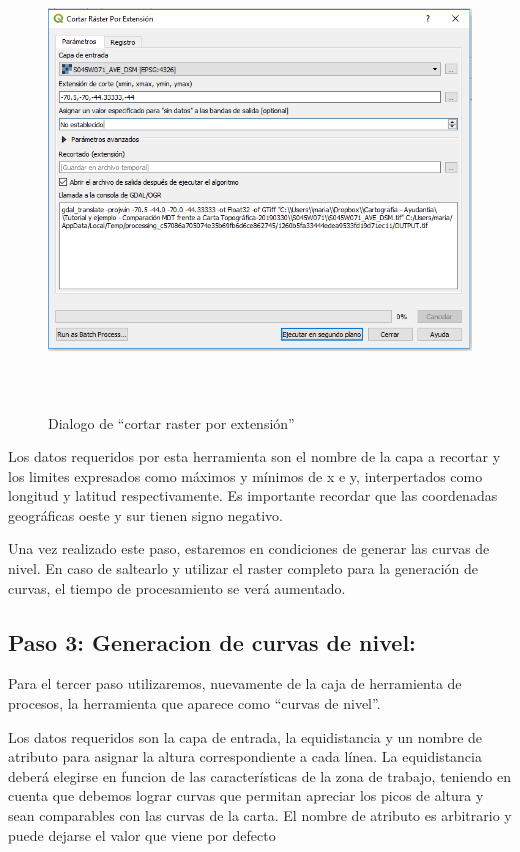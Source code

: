 \documentclass[12pt,]{extarticle}
\begin{document}
\begin{figure}
\centering
\includegraphics[width=5.90556in,height=4.78056in]{../img/image4.png}
\caption{Dialogo de ``cortar raster por extensión''}
\end{figure}

Los datos requeridos por esta herramienta son el nombre de la capa a
recortar y los limites expresados como máximos y mínimos de x e y,
interpertados como longitud y latitud respectivamente. Es importante
recordar que las coordenadas geográficas oeste y sur tienen signo
negativo.

Una vez realizado este paso, estaremos en condiciones de generar las
curvas de nivel. En caso de saltearlo y utilizar el raster completo para
la generación de curvas, el tiempo de procesamiento se verá aumentado.

\hypertarget{paso-3-generacion-de-curvas-de-nivel}{%
\subsection{Paso 3: Generacion de curvas de
nivel:}\label{paso-3-generacion-de-curvas-de-nivel}}

Para el tercer paso utilizaremos, nuevamente de la caja de herramienta
de procesos, la herramienta que aparece como ``curvas de nivel''.

Los datos requeridos son la capa de entrada, la equidistancia y un
nombre de atributo para asignar la altura correspondiente a cada línea.
La equidistancia deberá elegirse en funcion de las características de la
zona de trabajo, teniendo en cuenta que debemos lograr curvas que
permitan apreciar los picos de altura y sean comparables con las curvas
de la carta. El nombre de atributo es arbitrario y puede dejarse el
valor que viene por defecto
\end{document}
